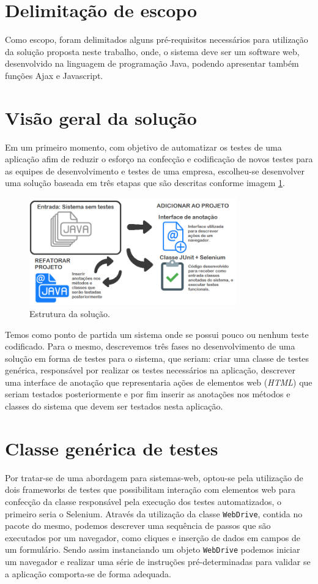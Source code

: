 \documentclass[tg]{mdtufsm}
\begin{document}
\section{Delimitação de escopo}

Como escopo, foram delimitados alguns pré-requisitos necessários para utilização da solução proposta neste trabalho, onde, o sistema deve ser um software web, desenvolvido na linguagem de programação Java, podendo apresentar também funções Ajax e Javascript.

\section{Visão geral da solução}
Em um primeiro momento, com objetivo de automatizar os testes de uma aplicação afim de reduzir o esforço na confecção e codificação de novos testes para as equipes de desenvolvimento e testes de uma empresa, escolheu-se desenvolver uma solução baseada em três etapas que são descritas conforme imagem \ref{fig:solucao1}.

\begin{figure}[!htb]
	\centering
	\includegraphics[width=0.8\textwidth]{solucao1}
	\caption{Estrutura da solução.}
	\label{fig:solucao1}
\end{figure}

Temos como ponto de partida um sistema onde se possui pouco ou nenhum teste codificado. Para o mesmo, descrevemos  três fases no desenvolvimento de uma solução em forma de testes para o sistema, que seriam: criar uma classe de testes genérica, responsável por realizar os testes necessários na aplicação,
descrever uma interface de anotação que representaria ações de elementos web (\emph{HTML}) que seriam testados posteriormente e por fim inserir as anotações nos métodos e classes do sistema que devem ser testados nesta aplicação.

\section{Classe genérica de testes}
Por tratar-se de uma abordagem para sistemas-web, optou-se pela utilização de dois frameworks de testes que possibilitam interação com elementos web para confecção da classe responsável pela execução dos testes automatizados, o primeiro seria o Selenium. Através da utilização da classe \texttt{WebDrive}, contida no pacote do mesmo, podemos descrever uma sequência de passos que são executados por um navegador, como cliques e inserção de dados em campos de um formulário. Sendo assim instanciando um objeto \texttt{WebDrive} podemos iniciar um navegador e realizar uma série de instruções pré-determinadas para validar se a aplicação comporta-se de forma adequada.
\end{document}
